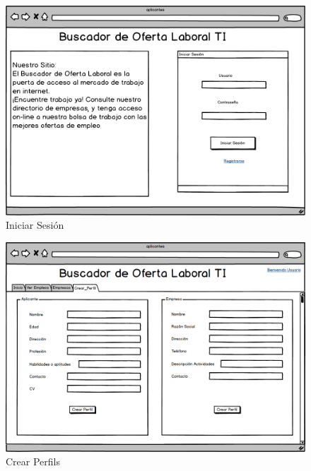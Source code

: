 \begin{figure}[h]
\begin{center}
	\includegraphics[scale=0.55]{./resources/04inicio.png}
	\caption{Iniciar Sesión}
	\label{fig:inicio}
\end{center}
\end{figure}
\begin{figure}[h]
\begin{center}
	\includegraphics[scale=0.55]{./resources/06perfil.png}
	\caption{Crear Perfils}
	\label{fig:perfil}
\end{center}
\end{figure}
